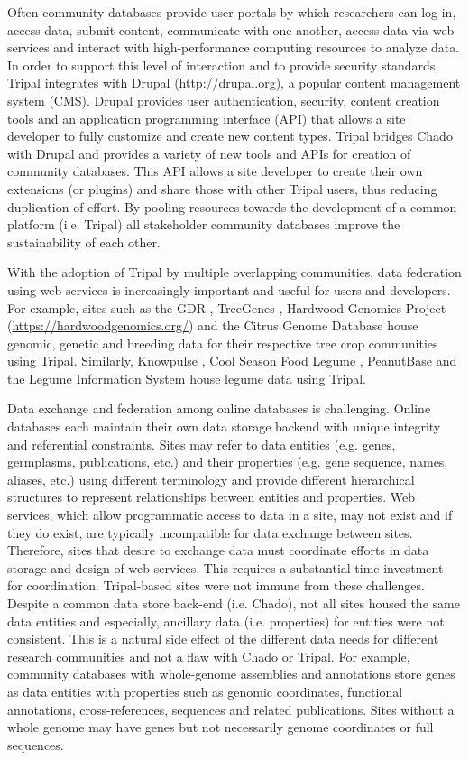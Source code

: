 Often community databases provide user portals by which researchers can log in, access data, submit content, communicate with one-another, access data via web services and interact with high-performance computing resources to analyze data. In order to support this level of interaction and to provide security standards, Tripal integrates with Drupal (http://drupal.org), a popular content management system (CMS). Drupal provides user authentication, security, content creation tools and an application programming interface (API) that allows a site developer to fully customize and create new content types. Tripal bridges Chado with Drupal and provides a variety of new tools and APIs for creation of community databases. This API allows a site developer to create their own extensions (or plugins) and share those with other Tripal users, thus reducing duplication of effort. By pooling resources towards the development of a common platform (i.e. Tripal) all stakeholder community databases improve the sustainability of each other.

With the adoption of Tripal by multiple overlapping communities, data federation using web services is increasingly important and useful for users and developers. For example, sites such as the GDR \cite{Jung_2018}, TreeGenes \cite{Falk_2018}, Hardwood Genomics Project (\url{https://hardwoodgenomics.org/}) and the Citrus Genome Database \cite{humann2019citrus} house genomic, genetic and breeding data for their respective tree crop communities using Tripal. Similarly, Knowpulse \cite{sanderson2019knowpulse}, Cool Season Food Legume \cite{Humann2017}, PeanutBase \cite{dash_cannon_kalberer_2016} and the Legume Information System \cite{Dash_2015} house legume data using Tripal.

Data exchange and federation among online databases is challenging. Online databases each maintain their own data storage backend with unique integrity and referential constraints. Sites may refer to data entities (e.g. genes, germplasms, publications, etc.) and their properties (e.g. gene sequence, names, aliases, etc.) using different terminology and provide different hierarchical structures to represent relationships between entities and properties. Web services, which allow programmatic access to data in a site, may not exist and if they do exist, are typically incompatible for data exchange between sites. Therefore, sites that desire to exchange data must coordinate efforts in data storage and design of web services. This requires a substantial time investment for coordination. Tripal-based sites were not immune from these challenges. Despite a common data store back-end (i.e. Chado), not all sites housed the same data entities and especially, ancillary data (i.e. properties) for entities were not consistent. This is a natural side effect of the different data needs for different research communities and not a flaw with Chado or Tripal. For example, community databases with whole-genome assemblies and annotations store genes as data entities with properties such as genomic coordinates, functional annotations, cross-references, sequences and related publications. Sites without a whole genome may have genes but not necessarily genome coordinates or full sequences.

